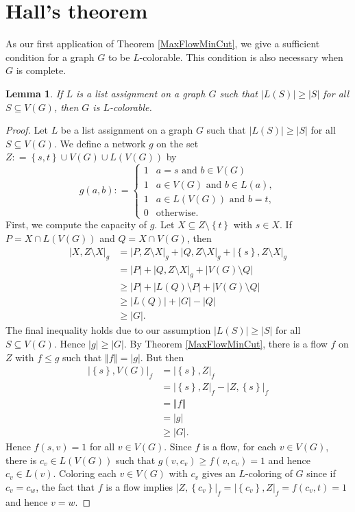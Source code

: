 \documentclass[openany]{tufte-book} %
\theoremstyle{plain}
\newtheorem{lemma}{Lemma}
\newcommand{\set}[1]{\left\{ #1 \right\}}
\newcommand{\card}[1]{\left|#1\right|}
\newcommand{\size}[1]{\left\Vert#1\right\Vert}
\newcommand{\DefinedAs}{\mathrel{\mathop:}=}
\begin{document}
\section{Hall's theorem}
As our first application of Theorem \ref{MaxFlowMinCut}, we give a sufficient condition for a graph $G$ to be $L$-colorable.  This 
condition is also necessary when $G$ is complete.
\begin{lemma}
If $L$ is a list assignment on a graph $G$ such that $\card{L(S)} \ge \card{S}$ for all $S \subseteq V(G)$, then $G$ is $L$-colorable.
\end{lemma}
\begin{proof}
Let $L$ be a list assignment on a graph $G$ such that $\card{L(S)} \ge \card{S}$ for all $S \subseteq V(G)$.  
We define a network $g$ on the set $Z \DefinedAs \set{s,t} \cup V(G) \cup L(V(G))$ by
\[g(a, b) \DefinedAs  \begin{cases} 
      1 & a = s \text{ and } b \in  V(G)\\
	  1 & a \in V(G) \text{ and } b \in L(a),\\
      1 & a \in L(V(G)) \text{ and } b=t,\\
      0 & \text{otherwise} .
   \end{cases}
\]
First, we compute the capacity of $g$. Let $X \subseteq Z \setminus \set{t}$ with $s \in X$.  If $P = X \cap L(V(G))$ and $Q = X \cap V(G)$, then
\begin{align*}
\card{X, Z\setminus X}_g &= \card{P, Z\setminus X}_g + \card{Q, Z\setminus X}_g + \card{\set{s}, Z\setminus X}_g\\
&=\card{P} + \card{Q, Z\setminus X}_g + \card{V(G)\setminus Q}\\
&\ge\card{P} + \card{L(Q) \setminus P} + \card{V(G)\setminus Q}\\
&\ge\card{L(Q)} + \card{G} - \card{Q}\\
&\ge \card{G}.
\end{align*}
The final inequality holds due to our assumption $\card{L(S)} \ge \card{S}$ for all $S \subseteq V(G)$. 
Hence $\card{g} \ge \card{G}$.  By Theorem \ref{MaxFlowMinCut}, there is a flow $f$ on $Z$ with $f \le g$ such that $\size{f} = \card{g}$.  But then
\begin{align*}
\card{\set{s}, V(G)}_f &=  \card{\set{s}, Z}_f \\
&= \card{\set{s}, Z}_f - \card{Z, \set{s}}_f\\
&=\size{f}\\
&= \card{g}\\
&\ge\card{G}.
\end{align*}
Hence $f(s,v) = 1$ for all $v \in V(G)$.  Since $f$ is a flow, for each $v \in V(G)$, there is $c_v \in L(V(G))$ such that $g(v, c_v) \ge f(v, c_v) = 1$ and hence $c_v \in L(v)$.
Coloring each $v \in V(G)$ with $c_v$ gives an $L$-coloring of $G$ since if $c_v = c_w$, the fact that $f$ is a flow implies 
$\card{Z, \set{c_v}}_f = \card{\set{c_v}, Z}_f = f(c_v, t) = 1$ and hence $v = w$.
\end{proof}
\end{document}
